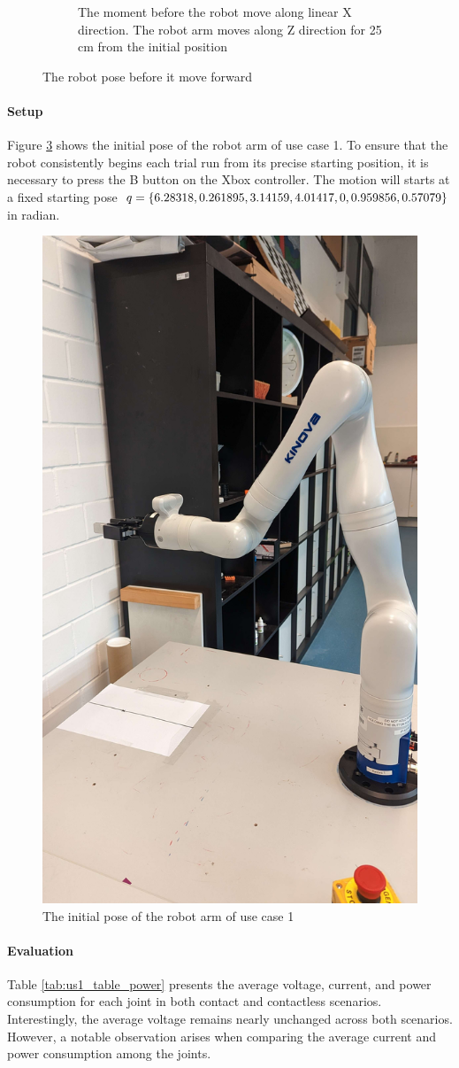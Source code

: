 \documentclass[report.tex]{subfiles}
\begin{document}
\begin{figure}[H]
\begin{subfigure}{0.49\textwidth}
                \caption{The moment before the robot move along linear X direction. The robot arm moves along Z direction for 25 cm from the initial position}
                \label{fig:us1_nocon}
            \end{subfigure}
            \caption{The robot pose before it move forward}
        \end{figure}
    \paragraph{\large{Setup}\\}
    Figure \ref{fig:us1_init} shows the initial pose of the robot arm of use case 1. To ensure that the robot consistently begins each trial run from its precise starting position, it is necessary to press the B button on the Xbox controller. The motion will starts at a fixed starting pose $q = \{6.28318,0.261895,3.14159,4.01417,0,\\0.959856,0.57079\}$ in radian.
    \begin{figure}[H]
        \centering
        \includegraphics[width=0.3\linewidth]{images/us1_initial.jpg}
        \caption{The initial pose of the robot arm of use case 1}
        \label{fig:us1_init}
    \end{figure}
    \paragraph{\large{Evaluation}\\}
    Table \ref{tab:us1_table_power} presents the average voltage, current, and power consumption for each joint in both contact and contactless scenarios. Interestingly, the average voltage remains nearly unchanged across both scenarios. However, a notable observation arises when comparing the average current and power consumption among the joints.
\end{document}
